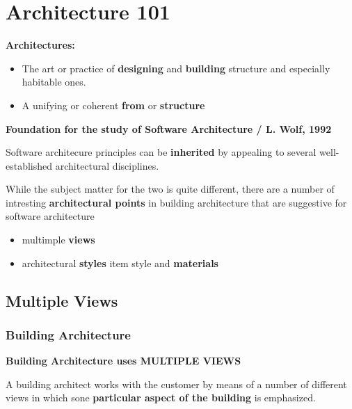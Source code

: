 \section{Architecture 101}



\textbf{Architectures:}
\begin{itemize}
	\item The art or practice of \textbf{designing} and \textbf{building} structure and especially habitable ones.
	\item A unifying or coherent \textbf{from} or \textbf{structure}
\end{itemize}

\textbf{Foundation for the study of Software Architecture / L. Wolf, 1992}

Software architecure principles can be \textbf{inherited} by appealing to several well-established architectural disciplines.

While the subject matter for the two is quite different, there are a number of intresting \textbf{architectural points} in building architecture that are suggestive for software architecture
\begin{itemize}
	\item multimple \textbf{views}
	\item architectural \textbf{styles}
	item style and \textbf{materials}
\end{itemize}

\subsection{Multiple Views}

\subsubsection{Building Architecture}

\textbf{Building Architecture uses MULTIPLE VIEWS}

A building architect works with the customer by means of a number of different views in which sone \textbf{particular aspect of the building} is emphasized.

